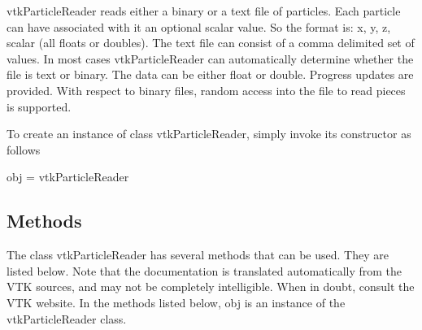 vtk\-Particle\-Reader reads either a binary or a text file of particles. Each particle can have associated with it an optional scalar value. So the format is\-: x, y, z, scalar (all floats or doubles). The text file can consist of a comma delimited set of values. In most cases vtk\-Particle\-Reader can automatically determine whether the file is text or binary. The data can be either float or double. Progress updates are provided. With respect to binary files, random access into the file to read pieces is supported.

To create an instance of class vtk\-Particle\-Reader, simply invoke its constructor as follows \begin{DoxyVerb}  obj = vtkParticleReader
\end{DoxyVerb}
 \hypertarget{vtkwidgets_vtkxyplotwidget_Methods}{}\subsection{Methods}\label{vtkwidgets_vtkxyplotwidget_Methods}
The class vtk\-Particle\-Reader has several methods that can be used. They are listed below. Note that the documentation is translated automatically from the V\-T\-K sources, and may not be completely intelligible. When in doubt, consult the V\-T\-K website. In the methods listed below, {\ttfamily obj} is an instance of the vtk\-Particle\-Reader class. 
